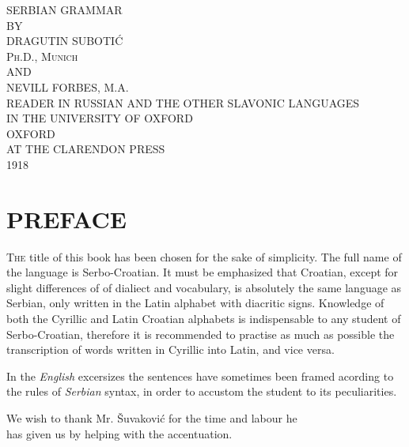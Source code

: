 \documentclass[11pt]{book}
\begin{document}
\begin{titlepage}
    \begin{center}
        {\Huge SERBIAN GRAMMAR}\\
        \vspace{0.5cm}
        BY\\
        \vspace{0.5cm}
        {\Large DRAGUTIN SUBOTIĆ}\\[5pt]
        \textsc{Ph.D., Munich}\\
        \vspace{0.5cm}
        AND\\
        \vspace{0.5cm}
        {\Large NEVILL FORBES, M.A.}\\[5pt]
        {\scriptsize READER IN RUSSIAN AND THE OTHER SLAVONIC LANGUAGES}\\
        {\scriptsize IN THE UNIVERSITY OF OXFORD}\\
        \vfill
        {\large OXFORD}\\
        {\large AT THE CLARENDON PRESS}\\
        {\large 1918}
    \end{center}
\end{titlepage}

\part*{\LARGE PREFACE}

{\onehalfspacing \large \textsc{The} title of this book has been chosen for the sake of simplicity. The
full name of the language is Serbo-Croatian. It must be emphasized that
Croatian, except for slight differences of of dialiect and vocabulary, is
absolutely the same language as Serbian, only written in the Latin alphabet
with diacritic signs. Knowledge of both the Cyrillic and Latin {Croatian}
alphabets is indispensable to any student of Serbo-Croatian, therefore it is
recommended to practise as much as possible the transcription of words written
in Cyrillic into Latin, and vice versa.

In the \textit{English} excersizes the sentences have sometimes been framed
acording to the rules of \textit{Serbian} syntax, in order to accustom the
student to its peculiarities.

We wish to thank Mr. \v{S}uvakovi\'{c} for the time and labour he\\[1.5pt]  
has given us by helping with the accentuation.}
\end{document}
